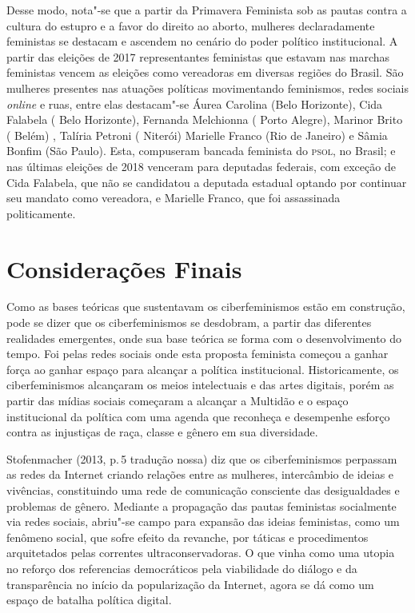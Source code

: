 Desse modo, nota"-se que a partir da Primavera Feminista sob as pautas
contra a cultura do estupro e a favor do direito ao aborto, mulheres
declaradamente feministas se destacam e ascendem no cenário do poder
político institucional. A partir das eleições de 2017 representantes
feministas que estavam nas marchas feministas vencem as eleições como
vereadoras em diversas regiões do Brasil. São mulheres presentes nas
atuações políticas movimentando feminismos, redes sociais \emph{\emph{online}} e ruas,
entre elas destacam"-se Áurea Carolina (Belo Horizonte), Cida Falabela (
Belo Horizonte), Fernanda Melchionna ( Porto Alegre), Marinor Brito (
Belém) , Talíria Petroni ( Niterói) Marielle Franco (Rio de Janeiro) e
Sâmia Bonfim (São Paulo). Esta, compuseram bancada feminista do \textsc{psol}, no
Brasil; e nas últimas eleições de 2018 venceram para deputadas federais,
com exceção de Cida Falabela, que não se candidatou a deputada estadual
optando por continuar seu mandato como vereadora, e Marielle Franco, que
foi assassinada politicamente.

\section{Considerações Finais}

Como as bases teóricas que sustentavam os ciberfeminismos estão em
construção, pode se dizer que os ciberfeminismos se desdobram, a partir
das diferentes realidades emergentes, onde sua base teórica se forma com
o desenvolvimento do tempo. Foi pelas redes sociais onde esta proposta
feminista começou a ganhar força ao ganhar espaço para alcançar a
política institucional. Historicamente, os ciberfeminismos alcançaram os
meios intelectuais e das artes digitais, porém as partir das mídias
sociais começaram a alcançar a Multidão e o espaço institucional da
política com uma agenda que reconheça e desempenhe esforço contra as
injustiças de raça, classe e gênero em sua diversidade.

Stofenmacher (2013, p.\,5 tradução nossa) diz que os ciberfeminismos
perpassam as redes da Internet criando relações entre as mulheres,
intercâmbio de ideias e vivências, constituindo uma rede de comunicação
consciente das desigualdades e problemas de gênero. Mediante a
propagação das pautas feministas socialmente via redes sociais, abriu"-se
campo para expansão das ideias feministas, como um fenômeno social, que
sofre efeito da revanche, por táticas e procedimentos arquitetados pelas
correntes ultraconservadoras. O que vinha como uma utopia no reforço dos
referencias democráticos pela viabilidade do diálogo e da transparência
no início da popularização da Internet, agora se dá como um espaço de
batalha política digital.

